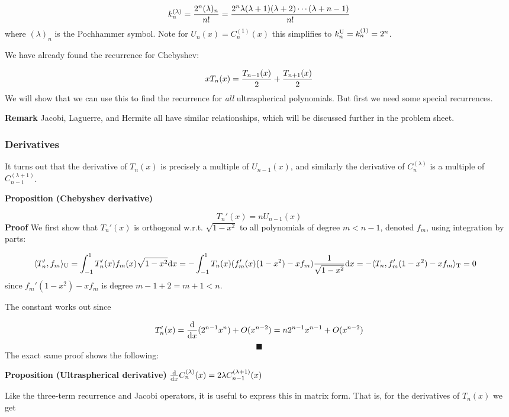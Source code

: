 \documentclass[12pt,a4paper]{article}
\begin{document}
\[
k_n^{(\lambda)} = {2^n (\lambda)_n \over n!} = {2^n \lambda (\lambda+1) (\lambda+2) \cdots (\lambda+n-1)  \over n!}
\]
where $(\lambda)_n$ is the Pochhammer symbol. Note for $U_n(x) = C_n^{(1)}(x)$ this simplifies to $k_n^{\rm U} = k_n^{(1)} = 2^n$.

We have  already found the recurrence for Chebyshev:

\[
x T_n(x) = {T_{n-1}(x) \over 2} +  {T_{n+1}(x) \over 2}
\]
We will show that we can use this to find the recurrence for \emph{all} ultraspherical polynomials. But first we need some special recurrences.

\textbf{Remark} Jacobi, Laguerre, and Hermite all have similar relationships, which will be discussed further in the problem sheet.

\subsubsection{Derivatives}
It turns out that the derivative of $T_n(x)$ is precisely a multiple of  $U_{n-1}(x)$, and similarly the derivative of $C_n^{(\lambda)}$ is a multiple of $C_{n-1}^{(\lambda+1)}$.

\textbf{Proposition (Chebyshev derivative)}

\[
T_n'(x) = n U_{n-1}(x)
\]
\textbf{Proof} We first show that $T_n'(x)$ is orthogonal w.r.t. $\sqrt{1-x^2}$ to all  polynomials of degree $m < n-1$, denoted $f_m$, using integration by parts:


\begin{align*}
\langle T_n',f_m\rangle_{\rm U} &= \int_{-1}^1 T_n'(x) f_m(x) \sqrt{1-x^2} {\rm d}x 
= -\int_{-1}^1 T_n(x) (f_m'(x)(1-x^2) - xf_m) {1  \over \sqrt{1-x^2}} {\rm d}x  
= - \langle T_n, f_m'(1-x^2) - x f_m \rangle_{\rm T}  = 0
\end{align*}
since $f_m'(1-x^2) - x f_m $ is degree $m-1 +2 = m+1 < n$.

The constant works out since

\[
T_n'(x) = {{\rm d} \over {\rm d}x} (2^{n-1} x^n)  + O(x^{n-2}) = n 2^{n-1} x^{n-1} + O(x^{n-2})
\]
\[
\blacksquare
\]
The exact same proof shows the following:

\textbf{Proposition (Ultraspherical derivative)} ${{\rm d} \over {\rm d}x} C_n^{(\lambda)}(x) = 2 \lambda  C_{n-1}^{(\lambda+1)}(x)$

Like the three-term recurrence and Jacobi operators, it is useful to express this in matrix form. That is, for the derivatives of $T_n(x)$ we get
\end{document}
